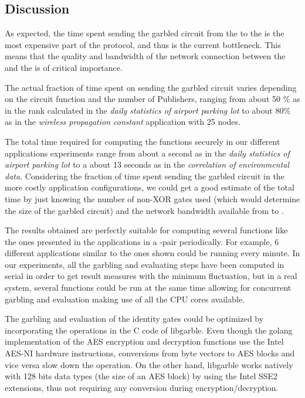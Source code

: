 

\subsection{Discussion}

As expected, the time spent sending the garbled circuit from the \garbler to
the \broker is the most expensive part of the protocol, and thus is the current
bottleneck.  This means that the quality and bandwidth of the network
connection between the \broker and the \garbler is of critical importance.

The actual fraction of time spent on sending the garbled circuit varies
depending on the circuit function and the number of Publishers, ranging from
about 50 \% as in the rank calculated in the \emph{daily statistics of airport
parking lot} to about 80\% as in the \emph{wireless propagation constant}
application with 25 nodes.

The total time required for computing the functions securely in our different
applications experiments range from about a second as in the \emph{daily
statistics of airport parking lot} to a about 13 seconds as in the
\emph{correlation of environmental data}.  Considering the fraction of time
spent sending the garbled circuit in the more costly application
configurations, we could get a good estimate of the total time by just knowing
the number of non-XOR gates used (which would determine the size of the garbled
circuit) and the network bandwidth available from \broker to \garbler.

The results obtained are perfectly suitable for computing several functions
like the ones presented in the applications in a \broker-\garbler pair
periodically.  For example, 6 different applications similar to the ones shown
could be running every minute.  In our experiments, all the garbling and
evaluating steps have been computed in serial in order to get result measures
with the minimum fluctuation, but in a real system, several functions could be
run at the same time allowing for concurrent garbling and evaluation making use
of all the CPU cores available.

The garbling and evaluation of the identity gates could be optimized by
incorporating the operations in the C code of libgarble.  Even though the
golang implementation of the AES encryption and decryption functions use the
Intel AES-NI hardware instructions, conversions from byte vectors to AES blocks
and vice versa slow down the operation.  On the other hand, libgarble works
natively with 128 bits data types (the size of an AES block) by using the Intel
SSE2 extensions, thus not requiring any conversion during
encryption/decryption.

